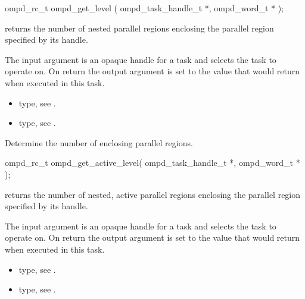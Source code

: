 \format
\cspecificstart
\begin{boxedcode}
ompd\_rc\_t ompd\_get\_level (
  ompd\_task\_handle\_t *, 
  ompd\_word\_t * 
); 
\end{boxedcode}
\cspecificend

\descr
{} returns the number of nested
parallel regions enclosing the parallel region specified by its handle.

\argdesc
The input argument  is an opaque handle for a task and selects the task to operate on.
On return the output argument  is set to the value that  would return 
when executed in this task.


\crossreferences
\begin{itemize}
	\item {} type, see .
	\item {} type, see .
\end{itemize}


\label{ompd:ompd_get_active_level}
\summary
Determine the number of enclosing  parallel regions.

\format
\cspecificstart
\begin{boxedcode}
ompd\_rc\_t ompd\_get\_active\_level(
  ompd\_task\_handle\_t *, 
  ompd\_word\_t *
); 
\end{boxedcode}
\cspecificend

\descr
{} returns the number of nested, active
parallel regions enclosing the parallel region specified by its handle.

\argdesc
The input argument  is an opaque handle for a task and selects the task to operate on.
On return the output argument  is set to the value that  would return when
executed in this task.

\crossreferences
\begin{itemize}
	\item {} type, see .
	\item {} type, see .
\end{itemize}


